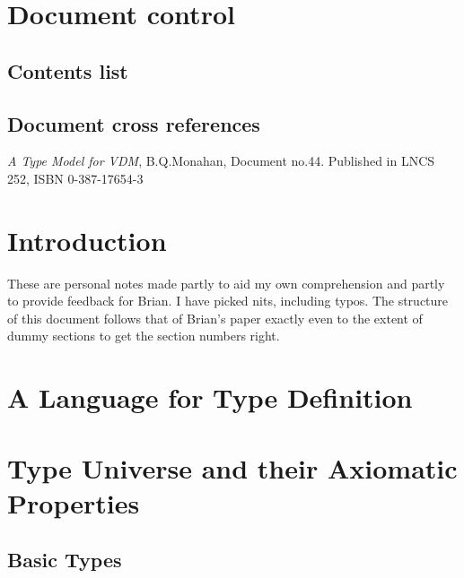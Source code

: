 \pagestyle{TPP}
\setcounter{section}{-1}
\TPPclass{ }
\TPPtype{}


\makeTPPfrontpage
\section{Document control}  %

\subsection{Contents list}  %

\tableofcontents
\subsection{Document cross references}  %

\begin{thebibliography}{99}

  {\em A Type Model for VDM}, B.Q.Monahan, Document no.44.
  Published in LNCS 252, ISBN 0-387-17654-3

\end{thebibliography}

\section{Introduction}
These are personal notes made partly to aid my own comprehension and
partly to provide feedback for Brian.
I have picked nits, including typos.
The structure of this document follows that of Brian's paper exactly
even to the extent of dummy sections to get the section numbers right.
\section{A Language for Type Definition}
\section{Type Universe and their Axiomatic Properties}

\subsection{Basic Types}

